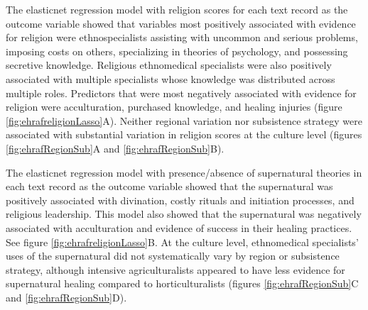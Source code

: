 \documentclass[
  11pt,
]{article}
\begin{document}
The elasticnet regression model with religion scores for each text record as the outcome variable showed that variables most positively associated with evidence for religion were ethnospecialists assisting with uncommon and serious problems, imposing costs on others, specializing in theories of psychology, and possessing secretive knowledge. Religious ethnomedical specialists were also positively associated with multiple specialists whose knowledge was distributed across multiple roles. Predictors that were most negatively associated with evidence for religion were acculturation, purchased knowledge, and healing injuries (figure \ref{fig:ehrafreligionLasso}A). Neither regional variation nor subsistence strategy were associated with substantial variation in religion scores at the culture level (figures \ref{fig:ehrafRegionSub}A and \ref{fig:ehrafRegionSub}B).

The elasticnet regression model with presence/absence of supernatural theories in each text record as the outcome variable showed that the supernatural was positively associated with divination, costly rituals and initiation processes, and religious leadership. This model also showed that the supernatural was negatively associated with acculturation and evidence of success in their healing practices. See figure \ref{fig:ehrafreligionLasso}B. At the culture level, ethnomedical specialists' uses of the supernatural did not systematically vary by region or subsistence strategy, although intensive agriculturalists appeared to have less evidence for supernatural healing compared to horticulturalists (figures \ref{fig:ehrafRegionSub}C and \ref{fig:ehrafRegionSub}D).
\end{document}

